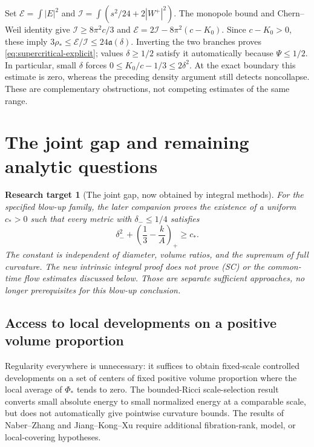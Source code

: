 \documentclass[a4paper,11pt]{article}
\numberwithin{equation}{section}
\newtheorem{target}[theorem]{Research target}
\theoremstyle{definition}
\begin{document}
Set $\mathcal E=\int|E|^2$ and
$\mathcal I=\int(s^2/24+2|W^+|^2)$.
The monopole bound and Chern--Weil identity give
$\mathcal I\ge8\pi^2c/3$ and
$\mathcal E=2\mathcal I-8\pi^2(c-K_0)$.
Since $c-K_0>0$, these imply
$3\rho_*\le\mathcal E/\mathcal I\le24\mathfrak a(\delta)$.
Inverting the two branches proves \eqref{eq:supercritical-explicit}; values $\delta\ge1/2$ satisfy it automatically because $\Psi\le1/2$. In particular, small $\delta$ forces
$0\le K_0/c-1/3\le2\delta^2$.
At the exact boundary this estimate is zero, whereas the preceding density argument still detects noncollapse. These are complementary obstructions, not competing estimates of the same range.

\section{The joint gap and remaining analytic questions}
\begin{target}[The joint gap, now obtained by integral methods]\label{tar:joint}
For the specified blow-up family, the later companion
 proves the existence of a uniform $c_*>0$
such that every metric with $\delta_-\le1/4$ satisfies
\begin{equation}\label{eq:joint}
\delta_-^2+\left(\frac13-\frac{k}{A}\right)_+\ge c_*.
\end{equation}
The constant is independent of diameter, volume ratios, and the supremum of full curvature. The new intrinsic integral proof does not prove (SC) or the common-time flow estimates discussed below. Those are separate sufficient approaches, no longer prerequisites for this blow-up conclusion.
\end{target}

\subsection{Access to local developments on a positive volume proportion}
Regularity everywhere is unnecessary: it suffices to obtain fixed-scale controlled developments on a set of centers of fixed positive volume proportion where the local average of $\Phi_*$ tends to zero. The bounded-Ricci scale-selection result\cite[Theorem 3.4]{GJ2017} converts small absolute energy to small normalized energy at a comparable scale, but does not automatically give pointwise curvature bounds. The results of Naber--Zhang and Jiang--Kong--Xu require additional fibration-rank, model, or local-covering hypotheses\cite{NZ,JKX}.
\end{document}
